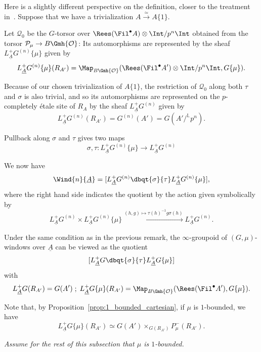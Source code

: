 \documentclass[10pt]{amsart}
\begin{document}
\begin{remark}
\label{rem:double_quotient_desc}
Here is a slightly different perspective on the definition, closer to the treatment in~\cites{MR4355476,MR4120808}. Suppose that we have a trivialization $A\xrightarrow{\simeq}A\{1\}$.

Let $\mathcal{Q}_0$ be the $G$-torsor over $\Rees(\Fil^\bullet A)\otimes\Int/p^n\Int$ obtained from the torsor $\mathcal{P}_\mu\to B\Gmh{\mathcal{O}}$: Its automorphisms are represented by the sheaf $L^+_{\underline{A}}G^{(n)}\{\mu\}$ given by
\[
L^+_{\underline{A}}G^{(n)}\{\mu\}({R_{A'}}) = \Map_{B\Gmh{\mathcal{O}}}(\Rees(\Fil^\bullet A')\otimes\Int/p^n\Int,G\{\mu\}).
\]

Because of our chosen trivialization of $A\{1\}$, the restriction of $\mathcal{Q}_0$ along both $\tau$ and $\sigma$ is also trivial, and so its automorphisms are represented on the $p$-completely \'etale site of $R_A$ by the sheaf $L^+_{\underline{A}}G^{(n)}$ given by
\[
L^+_{\underline{A}}G^{(n)}({R_{A'}}) = G^{(n)}(A') =  G(A'/^{\mathbb{L}}p^n).
\]

Pullback along $\sigma$ and $\tau$ gives two maps
\[
\sigma,\tau:L^+_{\underline{A}}G^{(n)}\{\mu\}\to L^+_{\underline{A}}G^{(n)}
\]

We now have
\[
 \Wind{n}{\underline{A}}= [L^+_{\underline{A}}G^{(n)}\dbqt{\sigma}{\tau} L^+_{\underline{A}}G^{(n)}\{\mu\}],
\]
where the right hand side indicates the quotient by the action given symbolically by
\[
L^+_{\underline{A}}G^{(n)}\times L^+_{\underline{A}}G^{(n)}\{\mu\}\xrightarrow{(h,g)\mapsto \tau(h)^{-1}g\sigma(h)}L^+_{\underline{A}}G^{(n)}.
\]
\end{remark}


\begin{remark}
\label{rem:infty_displays}
Under the same condition as in the previous remark, the $\infty$-groupoid of $(G,\mu)$-windows over $\underline{A}$ can be viewed as the quotient
\[
[L^+_{\underline{A}}G\dbqt{\sigma}{\tau} L^+_{\underline{A}}G\{\mu\}]
\]
with 
\[
L^+_{\underline{A}}G({R_{A'}}) = G(A')\;;\; L^+_{\underline{A}}G\{\mu\}({R_{A'}}) = \Map_{B\Gmh{\mathcal{O}}}(\Rees(\Fil^\bullet A'),G\{\mu\}).
\]

Note that, by Proposition~\ref{prop:1_bounded_cartesian}, if $\mu$ is $1$-bounded, we have
\[
L^+_{\underline{A}}G\{\mu\}({R_{A'}}) \simeq G(A')\times_{G(R_{A'})}P^-_\mu(R_{A'}).
\]
\end{remark}

\emph{Assume for the rest of this subsection that $\mu$ is $1$-bounded.}
\end{document}

